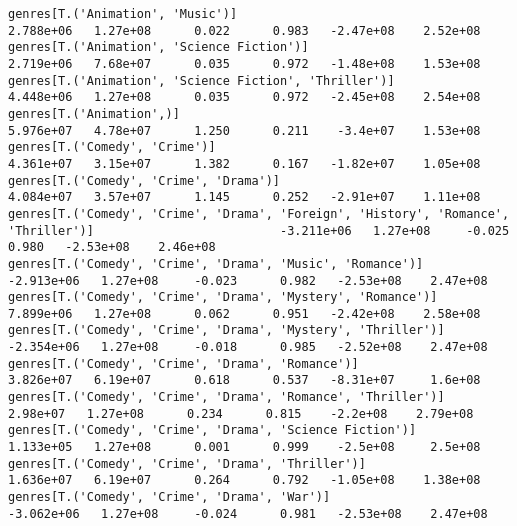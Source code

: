 \documentclass[11pt]{article}
\begin{document}
\begin{Verbatim}[commandchars=\\\{\}]
genres[T.('Animation', 'Music')]                                                                              2.788e+06   1.27e+08      0.022      0.983   -2.47e+08    2.52e+08
genres[T.('Animation', 'Science Fiction')]                                                                    2.719e+06   7.68e+07      0.035      0.972   -1.48e+08    1.53e+08
genres[T.('Animation', 'Science Fiction', 'Thriller')]                                                        4.448e+06   1.27e+08      0.035      0.972   -2.45e+08    2.54e+08
genres[T.('Animation',)]                                                                                      5.976e+07   4.78e+07      1.250      0.211    -3.4e+07    1.53e+08
genres[T.('Comedy', 'Crime')]                                                                                 4.361e+07   3.15e+07      1.382      0.167   -1.82e+07    1.05e+08
genres[T.('Comedy', 'Crime', 'Drama')]                                                                        4.084e+07   3.57e+07      1.145      0.252   -2.91e+07    1.11e+08
genres[T.('Comedy', 'Crime', 'Drama', 'Foreign', 'History', 'Romance', 'Thriller')]                          -3.211e+06   1.27e+08     -0.025      0.980   -2.53e+08    2.46e+08
genres[T.('Comedy', 'Crime', 'Drama', 'Music', 'Romance')]                                                   -2.913e+06   1.27e+08     -0.023      0.982   -2.53e+08    2.47e+08
genres[T.('Comedy', 'Crime', 'Drama', 'Mystery', 'Romance')]                                                  7.899e+06   1.27e+08      0.062      0.951   -2.42e+08    2.58e+08
genres[T.('Comedy', 'Crime', 'Drama', 'Mystery', 'Thriller')]                                                -2.354e+06   1.27e+08     -0.018      0.985   -2.52e+08    2.47e+08
genres[T.('Comedy', 'Crime', 'Drama', 'Romance')]                                                             3.826e+07   6.19e+07      0.618      0.537   -8.31e+07     1.6e+08
genres[T.('Comedy', 'Crime', 'Drama', 'Romance', 'Thriller')]                                                  2.98e+07   1.27e+08      0.234      0.815    -2.2e+08    2.79e+08
genres[T.('Comedy', 'Crime', 'Drama', 'Science Fiction')]                                                     1.133e+05   1.27e+08      0.001      0.999    -2.5e+08     2.5e+08
genres[T.('Comedy', 'Crime', 'Drama', 'Thriller')]                                                            1.636e+07   6.19e+07      0.264      0.792   -1.05e+08    1.38e+08
genres[T.('Comedy', 'Crime', 'Drama', 'War')]                                                                -3.062e+06   1.27e+08     -0.024      0.981   -2.53e+08    2.47e+08

\end{Verbatim}
\end{document}
